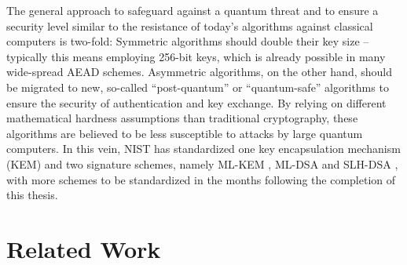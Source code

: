 The general approach to safeguard against a quantum threat and to ensure a security level similar to the resistance of today's algorithms against classical computers is two-fold:
Symmetric algorithms should double their key size -- typically this means employing 256-bit keys, which is already possible in many wide-spread AEAD schemes. Asymmetric algorithms, on the other hand, should be migrated to new, so-called ``post-quantum'' or ``quantum-safe'' algorithms to ensure the security of authentication and key exchange. By relying on different mathematical hardness assumptions than traditional cryptography, these algorithms are believed to be less susceptible to attacks by large quantum computers. In this vein, NIST has standardized \cite{nist-standardization} one key encapsulation mechanism (KEM) and two signature schemes, namely ML-KEM \cite{fips203}, ML-DSA \cite{fips204} and SLH-DSA \cite{fips205}, with more schemes to be standardized in the months following the completion of this thesis.

\section{Related Work} \label{sec:related-work}

